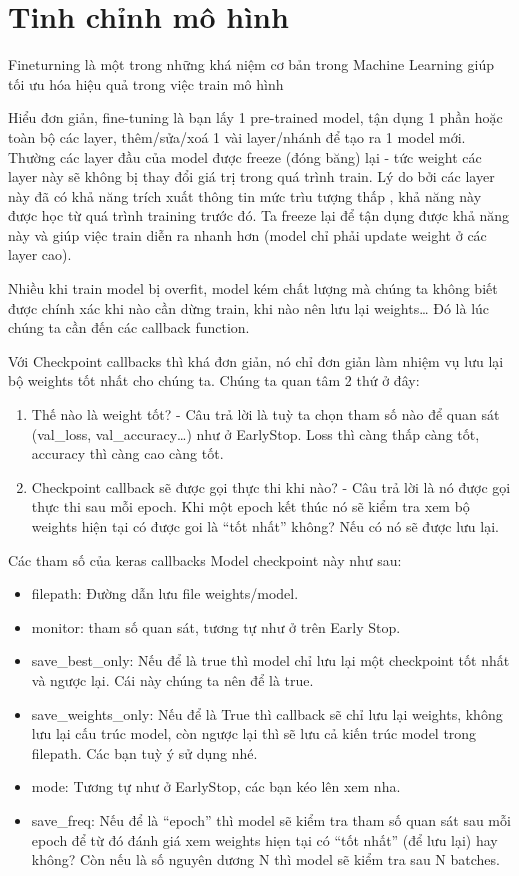 \documentclass[11pt]{article}
\begin{document}
    \section{Tinh chỉnh mô hình}\label{finetune-the-model}

Fineturning là một trong những khá niệm cơ bản trong Machine Learning giúp tối ưu hóa hiệu quả trong việc train mô hình

Hiểu đơn giản, fine-tuning là bạn lấy 1 pre-trained model, tận dụng 1 phần hoặc toàn bộ các layer, thêm/sửa/xoá 1 vài layer/nhánh để tạo ra 1 model mới. Thường các layer đầu của model được freeze (đóng băng) lại - tức weight các layer này sẽ không bị thay đổi giá trị trong quá trình train. Lý do bởi các layer này đã có khả năng trích xuất thông tin mức trìu tượng thấp , khả năng này được học từ quá trình training trước đó. Ta freeze lại để tận dụng được khả năng này và giúp việc train diễn ra nhanh hơn (model chỉ phải update weight ở các layer cao).

Nhiều khi train model bị overfit, model kém chất lượng mà chúng ta không biết được chính xác khi nào cần dừng train, khi nào nên lưu lại weights… Đó là lúc chúng ta cần đến các callback function.

Với Checkpoint callbacks thì khá đơn giản, nó chỉ đơn giản làm nhiệm vụ lưu lại bộ weights tốt nhất cho chúng ta. Chúng ta quan tâm 2 thứ ở đây:

\begin{enumerate}
    \item Thế nào là weight tốt? - Câu trả lời là tuỳ ta chọn tham số nào để quan sát (val\_loss, val\_accuracy…) như ở EarlyStop. Loss thì càng thấp càng tốt, accuracy thì càng cao càng tốt.
    \item Checkpoint callback sẽ được gọi thực thi khi nào? - Câu trả lời là nó được gọi thực thi sau mỗi epoch. Khi một epoch kết thúc nó sẽ kiểm tra xem bộ weights hiện tại có được goi là “tốt nhất” không? Nếu có nó sẽ được lưu lại.
\end{enumerate}

Các tham số của keras callbacks Model checkpoint này như sau:

\begin{itemize}
    \item filepath: Đường dẫn lưu file weights/model.
    \item monitor: tham số quan sát, tương tự như ở trên Early Stop.
    \item save\_best\_only: Nếu để là true thì model chỉ lưu lại một checkpoint tốt nhất và ngược lại. Cái này chúng ta nên để là true.
    \item save\_weights\_only: Nếu để là True thì callback sẽ chỉ lưu lại weights, không lưu lại cấu trúc model, còn ngược lại thì sẽ lưu cả kiến trúc model trong filepath. Các bạn tuỳ ý sử dụng nhé.
    \item mode: Tương tự như ở EarlyStop, các bạn kéo lên xem nha.
    \item save\_freq: Nếu để là “epoch” thì model sẽ kiểm tra tham số quan sát sau mỗi epoch để từ đó đánh giá xem weights hiẹn tại có “tốt nhất” (để lưu lại) hay không? Còn nếu là số nguyên dương N thì model sẽ kiểm tra sau N batches.
\end{itemize}
\end{document}
